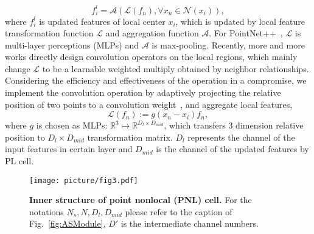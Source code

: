 \documentclass[10pt,twocolumn,letterpaper]{article}
\begin{document}
	\begin{equation}
	f_{i}^l =  \mathcal{A}(\mathcal{L}({f_n}), \forall x_n \in \mathcal{N}(x_i)),
	\label{eq1}
	\end{equation}
	where $f^{l}_{i}$ is updated features of local center $x_i$, which is updated by local feature transformation function $\mathcal{L}$ and aggregation function $\mathcal{A}$. For PointNet++~\cite{pointnet2}, $\mathcal{L}$ is multi-layer perceptions (MLPs) and $\mathcal{A}$ is max-pooling. Recently, more and more works directly design convolution operators on the local regions, which mainly change $\mathcal{L}$ to be a learnable weighted multiply obtained by neighbor relationships. Considering the efficiency and effectiveness of the operation in a compromise, we implement the convolution operation by adaptively projecting the relative position of two points to a convolution weight~\cite{PCCN,PointConv}, and aggregate local features,
	\begin{equation}
	\mathcal{L}(f_n) := g(x_n-x_i) f_n,
	\end{equation}
	where $g$ is chosen as MLPs: $\mathbb{R}^3 \mapsto \mathbb{R}^{D_{l}\times D_{mid}}$, which transfers 3 dimension relative position to $D_{l}\times D_{mid}$ transformation matrix. $D_{l}$ represents the channel of the input features in certain layer and $D_{mid}$ is the channel of the updated features by PL cell.
	
	\begin{figure}
		\begin{center}
			\texttt{[image: picture/fig3.pdf]}
		\end{center}
		\caption{\textbf{Inner structure of point nonlocal (PNL) cell.} For the notations $N_s, N, D_l, D_{mid}$ please refer to the caption of Fig.~\ref{fig:ASModule}, $D'$ is the intermediate channel numbers.}
		\label{fig:fig3NLC}
		\vspace{-0.3cm}
	\end{figure}
\end{document}
